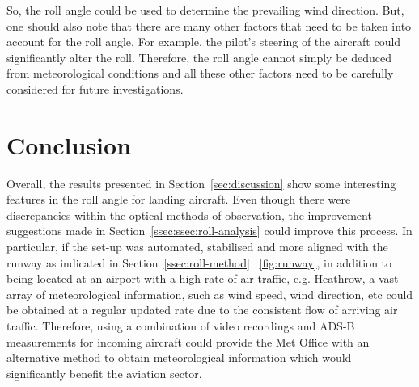 \documentclass[11pt]{article}
\newcommand{\figref}[2][\figurename~]{#1\ref{#2}}
\newcommand{\secref}[2][Section~]{#1\ref{#2}}
\begin{document}
So, the roll angle could be used to determine the prevailing wind direction. But, one should also note that there are many other factors that need to be taken into account for the roll angle. For example, the pilot's steering of the aircraft could significantly alter the roll. Therefore, the roll angle cannot simply be deduced from meteorological conditions and all these other factors need to be carefully considered for future investigations.




\section{Conclusion}
\label{sec:conclusion}

Overall, the results presented in \secref{sec:discussion} show some interesting features in the roll angle for landing aircraft. Even though there were discrepancies within the optical methods of observation, the improvement suggestions made in \secref{ssec:ssec:roll-analysis} could improve this process. In particular, if the set-up was automated, stabilised and more aligned with the runway as indicated in \secref{ssec:roll-method} \figref{fig:runway}, in addition to being located at an airport with a high rate of air-traffic, e.g. Heathrow, a vast array of meteorological information, such as wind speed, wind direction, etc could be obtained at a regular updated rate due to the consistent flow of arriving air traffic. Therefore, using a combination of video recordings and ADS-B measurements for incoming aircraft could provide the Met Office with an alternative method to obtain meteorological information which would significantly benefit the aviation sector.
\end{document}
